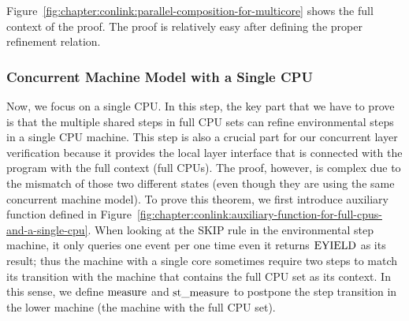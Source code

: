 Figure~\ref{fig:chapter:conlink:parallel-composition-for-multicore} shows the full context of the proof. 
The proof is relatively easy after defining the proper refinement relation. 

\subsubsection{Concurrent Machine Model with a Single CPU}


Now, we focus on a single CPU. 
In this step, 
the key part that we have to prove is that the multiple shared steps in full CPU sets can
 refine environmental steps in a single CPU machine.
This step is also a crucial part for our concurrent layer verification because
it provides the local layer interface that is connected with the program with the full context (full CPUs).
The proof, however, is complex due to the mismatch of those two different states (even though they are 
using the same concurrent machine model).
To prove this theorem, 
we first introduce auxiliary function defined in Figure~\ref{fig:chapter:conlink:auxiliary-function-for-full-cpus-and-a-single-cpu}. 
When looking at the \textsf{SKIP} rule in the environmental step machine, 
it only queries one event per one time even it returns ${\mathrm{EYIELD}}$ as its result;
thus the machine with a single core sometimes require two steps to match its transition with the 
machine that contains the full CPU set as its context. 
In this sense, we define ${\mathrm{measure}}$ and ${\mathrm{st}\_\mathrm{measure}}$ to 
postpone the step transition in the lower machine (the machine with the full CPU set). 

